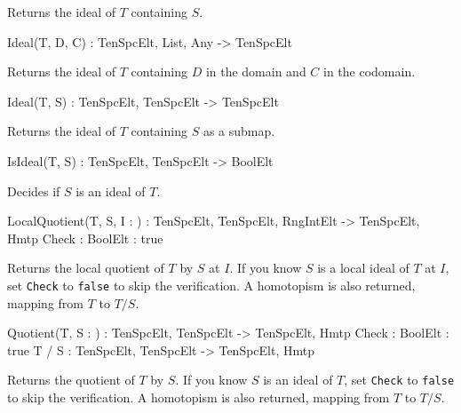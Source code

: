 Returns the ideal of $T$ containing $S$.

\begin{intrinsics}
Ideal(T, D, C) : TenSpcElt, List, Any -> TenSpcElt
\end{intrinsics}

Returns the ideal of $T$ containing $D$ in the domain and $C$ in the codomain.

\begin{intrinsics}
Ideal(T, S) : TenSpcElt, TenSpcElt -> TenSpcElt
\end{intrinsics}

Returns the ideal of $T$ containing $S$ as a submap.

\begin{intrinsics}
IsIdeal(T, S) : TenSpcElt, TenSpcElt -> BoolElt
\end{intrinsics}

Decides if $S$ is an ideal of $T$.

\begin{intrinsics}
LocalQuotient(T, S, I : \parameters) : TenSpcElt, TenSpcElt, {RngIntElt} -> TenSpcElt, Hmtp
Check : BoolElt : true
\end{intrinsics}

Returns the local quotient of $T$ by $S$ at $I$. If you know $S$ is a local 
ideal of $T$ at $I$, set {\tt Check} to {\tt false} to skip the verification.
A homotopism is also returned, mapping from $T$ to $T/S$.

\begin{intrinsics}
Quotient(T, S : \parameters) : TenSpcElt, TenSpcElt -> TenSpcElt, Hmtp
Check : BoolElt : true
T / S : TenSpcElt, TenSpcElt -> TenSpcElt, Hmtp
\end{intrinsics}

Returns the quotient of $T$ by $S$. If you know $S$ is an ideal of $T$, 
set {\tt Check} to {\tt false} to skip the verification.
A homotopism is also returned, mapping from $T$ to $T/S$.

